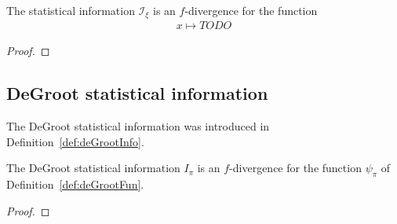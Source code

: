 
\begin{lemma}
  \label{lem:statInfo_eq_fDiv}
  The statistical information $\mathcal I_\xi$ is an $f$-divergence for the function
  \begin{align*}
  x \mapsto TODO
  \end{align*}
  
\end{lemma}

\begin{proof}%
{}

\end{proof}

\subsection{DeGroot statistical information}

The DeGroot statistical information was introduced in Definition~\ref{def:deGrootInfo}.

\begin{lemma}
  \label{lem:deGrootInfo_eq_fDiv}
  The DeGroot statistical information $I_\pi$ is an $f$-divergence for the function $\psi_\pi$ of Definition~\ref{def:deGrootFun}.
\end{lemma}

\begin{proof}%
{}

\end{proof}
